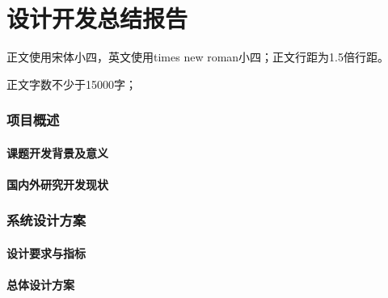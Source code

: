 \part{设计开发总结报告} %
\label{prt:设计开发总结报告_}
	\setcounter{section}{0}
	正文使用宋体小四，英文使用times new roman小四；正文行距为1.5倍行距。
	
	正文字数不少于15000字；

	\section{项目概述} %
	\label{sec:项目概述}
		\subsection{课题开发背景及意义} %
		\label{sub:课题开发背景及意义}
		
		\newpage

		\subsection{国内外研究开发现状} %
		\label{sub:国内外研究开发现状}
		
	\newpage

	\section{系统设计方案} %
	\label{sec:系统设计方案}
		\subsection{设计要求与指标} %
		\label{sub:设计要求与指标}
		
		\newpage

		\subsection{总体设计方案} %
		\label{sub:总体设计方案}
		
		\newpage

